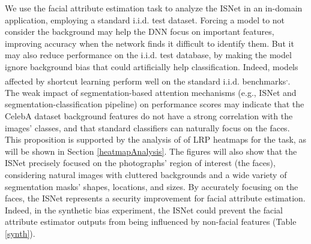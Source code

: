 \documentclass[fleqn,10pt]{wlscirep}
\begin{document}
{We use the facial attribute estimation task to analyze the ISNet in an in-domain application, employing a standard i.i.d. test dataset. Forcing a model to not consider the background may help the DNN focus on important features, improving accuracy when the network finds it difficult to identify them. But it may also reduce performance on the i.i.d. test database, by making the model ignore background bias that could artificially help classification. Indeed, models affected by shortcut learning perform well on the standard i.i.d. benchmarks\cite{ShortcutLearning}\textsuperscript{,}\cite{ShortcutCovid}. The weak impact of segmentation-based attention mechanisms (e.g., ISNet and segmentation-classification pipeline) on performance scores may indicate that the CelebA\cite{celebA} dataset background features do not have a strong correlation with the images' classes, and that standard classifiers can naturally focus on the faces. This proposition is supported by the analysis of of LRP heatmaps for the task, as will be shown in Section \ref{heatmapAnalysis}. The figures will also show that the ISNet precisely focused on the photographs' region of interest (the faces), considering natural images with cluttered backgrounds and a wide variety of segmentation masks' shapes, locations, and sizes. By accurately focusing on the faces, the ISNet represents a security improvement for facial attribute estimation. Indeed, in the synthetic bias experiment, the ISNet could prevent the facial attribute estimator outputs from being influenced by non-facial features (Table \ref{synth}).


}
\end{document}
